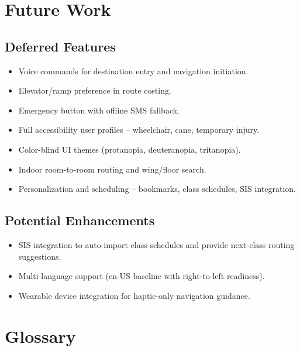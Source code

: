 \documentclass[12pt]{article}
\begin{document}
\section{Future Work}

\subsection{Deferred Features}
\begin{itemize}
    \item Voice commands for destination entry and navigation initiation.
    \item Elevator/ramp preference in route costing.
    \item Emergency button with offline SMS fallback.
    \item Full accessibility user profiles -- wheelchair, cane, temporary injury.
    \item Color-blind UI themes (protanopia, deuteranopia, tritanopia).
    \item Indoor room-to-room routing and wing/floor search.
    \item Personalization and scheduling -- bookmarks, class schedules, SIS integration.
\end{itemize}

\subsection{Potential Enhancements}
\begin{itemize}
    \item SIS integration to auto-import class schedules and provide next-class routing suggestions.
    \item Multi-language support (en-US baseline with right-to-left readiness).
    \item Wearable device integration for haptic-only navigation guidance.
\end{itemize}

\section{Glossary}
\end{document}

